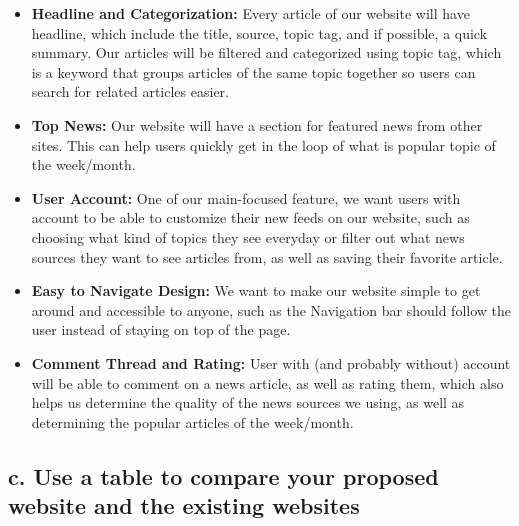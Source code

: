 \documentclass{article}
\begin{document}
\begin{itemize}
    \item \textbf{Headline and Categorization:} Every article of our website will have headline, which include the title, source, topic tag, and if possible, a quick summary. Our articles will be filtered and categorized using topic tag, which is a keyword that groups articles of the same topic together so users can search for related articles easier.
    
    \item \textbf{Top News:} Our website will have a section for featured news from other sites. This can help users quickly get in the loop of what is popular topic of the week/month.
    
    \item \textbf{User Account:} One of our main-focused feature, we want users with account to be able to customize their new feeds on our website, such as choosing what kind of topics they see everyday or filter out what news sources they want to see articles from, as well as saving their favorite article.
    
    \item \textbf{Easy to Navigate Design:} We want to make our website simple to get around and accessible to anyone, such as the Navigation bar should follow the user instead of staying on top of the page.
    
    \item \textbf{Comment Thread and Rating:} User with (and probably without) account will be able to comment on a news article, as well as rating them, which also helps us determine the quality of the news sources we using, as well as determining the popular articles of the week/month.

    
\end{itemize}


\subsection{c. Use a table to compare your proposed website and the existing websites}
\end{document}
